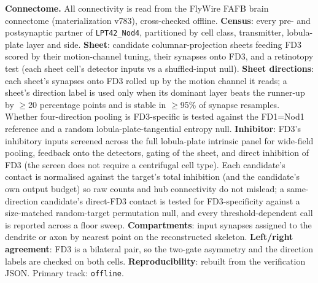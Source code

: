 \documentclass[11pt]{article}
\newcommand{\ttt}[1]{\texttt{#1}}
\begin{document}
\textbf{Connectome.} All connectivity is read from the FlyWire FAFB brain connectome (materialization v783), cross-checked offline. \textbf{Census}: every pre- and postsynaptic partner of \ttt{LPT42\_Nod4}, partitioned by cell class, transmitter, lobula-plate layer and side. \textbf{Sheet}: candidate columnar-projection sheets feeding FD3 scored by their motion-channel tuning, their synapses onto FD3, and a retinotopy test (each sheet cell's detector inputs vs a shuffled-input null). \textbf{Sheet directions}: each sheet's synapses onto FD3 rolled up by the motion channel it reads; a sheet's direction label is used only when its dominant layer beats the runner-up by $\geq$20 percentage points and is stable in $\geq$95\% of synapse resamples. Whether four-direction pooling is FD3-specific is tested against the FD1=Nod1 reference and a random lobula-plate-tangential entropy null. \textbf{Inhibitor}: FD3's inhibitory inputs screened across the full lobula-plate intrinsic panel for wide-field pooling, feedback onto the detectors, gating of the sheet, and direct inhibition of FD3 (the screen does not require a centrifugal cell type). Each candidate's contact is normalised against the target's total inhibition (and the candidate's own output budget) so raw counts and hub connectivity do not mislead; a same-direction candidate's direct-FD3 contact is tested for FD3-specificity against a size-matched random-target permutation null, and every threshold-dependent call is reported across a floor sweep. \textbf{Compartments}: input synapses assigned to the dendrite or axon by nearest point on the reconstructed skeleton. \textbf{Left/right agreement}: FD3 is a bilateral pair, so the two-gate asymmetry and the direction labels are checked on both cells. \textbf{Reproducibility}: rebuilt from the verification JSON. Primary track: \ttt{offline}.

\clearpage
\end{document}
